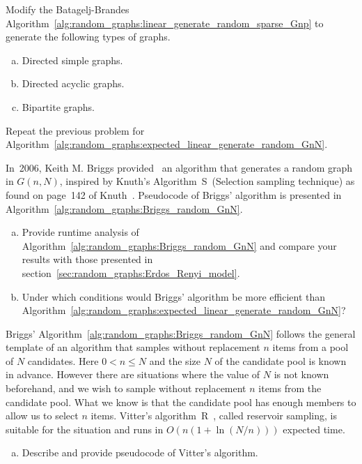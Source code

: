 \begin{problem}
\item Modify the Batagelj-Brandes
  Algorithm~\ref{alg:random_graphs:linear_generate_random_sparse_Gnp}
  to generate the following types of graphs.
  \begin{enumerate}[(a)]
  \item Directed simple graphs.

  \item Directed acyclic graphs.

  \item Bipartite graphs.
  \end{enumerate}

\item Repeat the previous problem for
  Algorithm~\ref{alg:random_graphs:expected_linear_generate_random_GnN}.

\item In~2006, Keith M. Briggs
  provided~\cite{Briggs2011} an algorithm that generates a random
  graph in $G(n,N)$, inspired by Knuth's
  Algorithm~S~(Selection sampling technique) as found on page~142 of
  Knuth~\cite{Knuth1998b}. Pseudocode of
  Briggs' algorithm is presented in
  Algorithm~\ref{alg:random_graphs:Briggs_random_GnN}.
  \begin{enumerate}[(a)]
  \item Provide runtime analysis of
    Algorithm~\ref{alg:random_graphs:Briggs_random_GnN} and compare
    your results with those presented in
    section~\ref{sec:random_graphs:Erdos_Renyi_model}.

  \item Under which conditions would Briggs' algorithm be more
    efficient than
    Algorithm~\ref{alg:random_graphs:expected_linear_generate_random_GnN}?
  \end{enumerate}

\item Briggs'
  Algorithm~\ref{alg:random_graphs:Briggs_random_GnN} follows the
  general template of an algorithm that samples without replacement
  $n$ items from a pool of $N$ candidates. Here $0 < n \leq N$ and the
  size $N$ of the candidate pool is known in advance. However there
  are situations where the value of $N$ is not known beforehand, and
  we wish to sample without replacement $n$ items from the candidate
  pool. What we know is that the candidate pool has enough members to
  allow us to select $n$ items. Vitter's
  algorithm~R~\cite{Vitter1985}, called
  reservoir sampling, is suitable for the
  situation and runs in $O(n (1 + \ln(N/n)))$ expected time.
  \begin{enumerate}[(a)]
  \item Describe and provide pseudocode of
    Vitter's algorithm.


\end{enumerate}
\end{problem}
